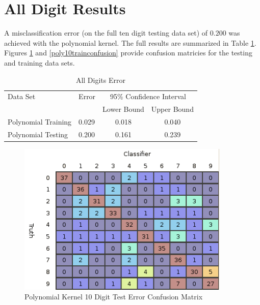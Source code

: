 \documentclass{article}
\begin{document}
\section{All Digit Results}\label{ResultsAll}

A misclassification error (on the full ten digit testing data set) of \(0.200\) was achieved with the polynomial kernel. The full results are summarized in Table \ref{error2}. Figures \ref{poly10testconfusion} and \ref{poly10trainconfusion} provide confusion matricies for the testing and training data sets.

\begin{table}
\caption{All Digits Error}
\begin{center}
\begin{tabular}{llcc}
\toprule
Data Set & Error & \multicolumn{2}{c}{95\% Confidence Interval} \\
\cmidrule(r){3-4}
& & Lower Bound & Upper Bound \\
\midrule
Polynomial Training & 0.029 & 0.018 & 0.040 \\
Polynomial Testing & 0.200 & 0.161 & 0.239 \\
\bottomrule
\end{tabular}
\label{error2}
\end{center}
\end{table}

\begin{figure}
\centering
\includegraphics[width=0.9\textwidth]{images/poly_all_confusion_test.png}
\caption{Polynomial Kernel 10 Digit Test Error Confusion Matrix}
\label{poly10testconfusion}
\end{figure}
\end{document}
